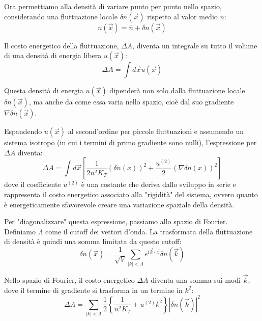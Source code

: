 Ora permettiamo alla densità di variare punto per punto nello spazio, considerando una fluttuazione locale $\delta n(\vec{x})$ rispetto al valor medio $\bar{n}$:
\begin{equation}
    n(\vec{x})=\overline{n}+\delta n(\vec{x})
    \label{eq:n_locale}
\end{equation}

Il costo energetico della fluttuazione, $\Delta A$, diventa un integrale su tutto il volume di una densità di energia libera $u(\vec{x})$:
\begin{equation}
    \Delta A=\int d\vec{x}u(\vec{x})
    \label{eq:delta_A_integrale}
\end{equation}

Questa densità di energia $u(\vec{x})$ dipenderà non solo dalla fluttuazione locale $\delta n(\vec{x})$, ma anche da come essa varia nello spazio, cioè dal suo gradiente $\nabla \delta n(\vec{x})$.

Espandendo $u(\vec{x})$ al second'ordine per piccole fluttuazioni e assumendo un sistema isotropo (in cui i termini di primo gradiente sono nulli), l'espressione per $\Delta A$ diventa:
\begin{equation}
    \Delta A=\int d\vec{x}\left[\frac{1}{2n^{2}K_{T}}(\delta n(x))^{2}+\frac{u^{(2)}}{2}(\nabla \delta n(x))^2\right]
    \label{eq:delta_A_espanso}
\end{equation}
dove il coefficiente $u^{(2)}$ è una costante che deriva dallo sviluppo in serie e rappresenta il costo energetico associato alla "rigidità" del sistema, ovvero quanto è energeticamente sfavorevole creare una variazione spaziale della densità.

Per "diagonalizzare" questa espressione, passiamo allo spazio di Fourier. Definiamo $\Lambda$ come il cutoff dei vettori d'onda. La trasformata della fluttuazione di densità è quindi una somma limitata da questo cutoff:
\begin{equation}
    \delta n(\vec{x})=\frac{1}{\sqrt{V}}\sum_{|k|<\Lambda}e^{i\vec{k}\cdot \vec{x}}\delta n(\vec{k})
    \label{eq:fourier_n}
\end{equation}

Nello spazio di Fourier, il costo energetico $\Delta A$ diventa una somma sui modi $\vec{k}$, dove il termine di gradiente si trasforma in un termine in $k^2$:
\begin{equation}
    \Delta A=\sum_{|k|<\Lambda}\frac{1}{2}\left\{\frac{1}{n^{2}K_{T}}+u^{(2)} k^{2}\right\}|\delta n(\vec{k})|^{2}
    \label{eq:delta_A_fourier}
\end{equation}

